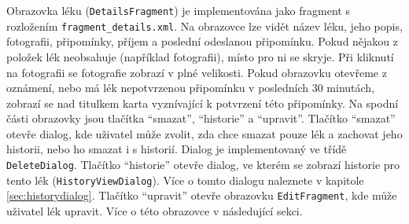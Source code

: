 \documentclass[../TakeYourPill.tex]{subfiles}
\begin{document}
Obrazovka léku (\texttt{DetailsFragment}) je implementována jako fragment s rozložením \texttt{fragment\_details.xml}. Na obrazovce lze vidět název léku, jeho popis, fotografii, připomínky, příjem a poslední odeslanou připomínku. Pokud nějakou z položek lék neobsahuje (například fotografii), místo pro ni se skryje. Při kliknutí na fotografii se fotografie zobrazí v plné velikosti. Pokud obrazovku otevřeme z oznámení, nebo má lék nepotvrzenou připomínku v posledních 30 minutách, zobrazí se nad titulkem karta vyznívající k potvrzení této připomínky. Na spodní části obrazovky jsou tlačítka \enquote{smazat}, \enquote{historie} a \enquote{upravit}. Tlačítko \enquote{smazat} otevře dialog, kde uživatel může zvolit, zda chce smazat pouze lék a zachovat jeho historii, nebo ho smazat i s historií. Dialog je implementovaný ve třídě \texttt{DeleteDialog}. Tlačítko \enquote{historie} otevře dialog, ve kterém se zobrazí historie pro tento lék (\texttt{HistoryViewDialog}). Více o tomto dialogu naleznete v kapitole \ref{sec:historydialog}. Tlačítko \enquote{upravit} otevře obrazovku \texttt{EditFragment}, kde může uživatel lék upravit. Více o této obrazovce v následující sekci.
\end{document}
